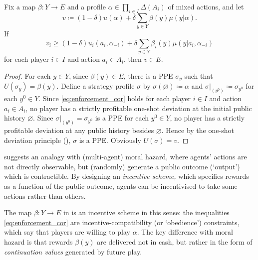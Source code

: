 \begin{corollary}
	\label{corollary:enforcement}
	Fix a map $\beta : Y \to E$ and a profile $\alpha \in \prod_{i \in I} \Delta(A_i)$ of mixed actions, and let
	\begin{equation*}
		v \coloneqq (1-\delta) u(\alpha) + \delta \sum_{y \in Y} \beta(y) \mu(y|\alpha) .
	\end{equation*}
	If
	\begin{equation}
		v_i \geq (1-\delta) u_i(a_i,\alpha_{-i}) + \delta \sum_{y \in Y} \beta_i(y) \mu(y|a_i,\alpha_{-i})
		\label{eq:enforcement_cor}
	\end{equation}
	for each player $i \in I$ and action $a_i \in A_i$, then $v \in E$.
\end{corollary}

\begin{proof}
	For each $y \in Y$, since $\beta(y) \in E$, there is a PPE $\sigma_y$ such that $U(\sigma_y) = \beta(y)$. Define a strategy profile $\sigma$ by $\sigma(\varnothing) \coloneqq \alpha$ and $\sigma|_{\left(y^0\right)} \coloneqq \sigma_{y^0}$ for each $y^0 \in Y$. Since \eqref{eq:enforcement_cor} holds for each player $i \in I$ and action $a_i \in A_i$, no player has a strictly profitable one-shot deviation at the initial public history $\varnothing$. Since $\sigma|_{\left(y^0\right)} = \sigma_{y^0}$ is a PPE for each $y^0 \in Y$, no player has a strictly profitable deviation at any public history besides $\varnothing$. Hence by the one-shot deviation principle (), $\sigma$ is a PPE. Obviously $U(\sigma)=v$.
\end{proof}

 suggests an analogy with (multi-agent) moral hazard, where agents' actions are not directly observable, but (randomly) generate a public outcome (`output') which is contractible. By designing an \emph{incentive scheme,} which specifies rewards as a function of the public outcome, agents can be incentivised to take some actions rather than others.

The map $\beta : Y \to E$ in  is an incentive scheme in this sense: the inequalities \eqref{eq:enforcement_cor} are incentive-compatibility (or `obedience') constraints, which say that players are willing to play $\alpha$. The key difference with moral hazard is that rewards $\beta(y)$ are delivered not in cash, but rather in the form of \emph{continuation values} generated by future play.

